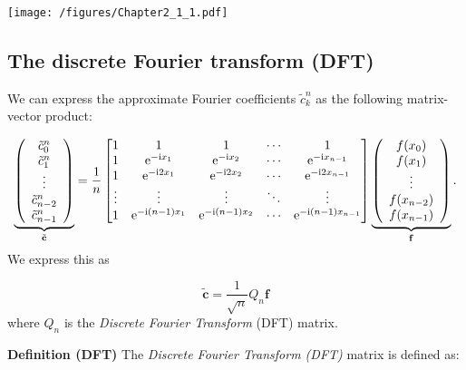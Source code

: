 \documentclass[12pt,a4paper]{article}
\begin{document}
\texttt{[image: /figures/Chapter2\_1\_1.pdf]}

\subsection{The discrete Fourier transform (DFT)}
We can express the approximate Fourier coefficients $\tilde{c}^n_k$ as the following matrix-vector product:

\[
\underbrace{\left(
\begin{array}{c}
\tilde{c}^n_0 \\
\tilde{c}^n_1 \\
\vdots \\
\tilde{c}^n_{n-2} \\
\tilde{c}^n_{n-1}
\end{array}
\right)}_{\tilde{\mathbf{c}}} = 
{1 \over n} \begin{bmatrix} 1 & 1 & 1&  \ensuremath{\cdots} & 1 \\
                                    1 & {\rm e}^{-{\rm i} x_1} & {\rm e}^{-{\rm i} x_2} & \ensuremath{\cdots} & {\rm e}^{-{\rm i} x_{n-1}} \\
                                    1 & {\rm e}^{-{\rm i} 2 x_1} & {\rm e}^{-{\rm i} 2 x_2} & \ensuremath{\cdots} & {\rm e}^{-{\rm i} 2x_{n-1}} \\
                                    \ensuremath{\vdots} & \ensuremath{\vdots} & \ensuremath{\vdots} & \ensuremath{\ddots} & \ensuremath{\vdots} \\
                                    1 & {\rm e}^{-{\rm i} (n-1) x_1} & {\rm e}^{-{\rm i} (n-1) x_2} & \ensuremath{\cdots} & {\rm e}^{-{\rm i} (n-1) x_{n-1}}
\end{bmatrix} 
\underbrace{\left(
\begin{array}{c}
f(x_0) \\
f(x_1) \\
\vdots \\
f(x_{n-2}) \\
f(x_{n-1})
\end{array}
\right)}_{\mathbf{f}}.
\]
We express this as

\[
\tilde{\mathbf{c}} = \frac{1}{\sqrt{n}}Q_{n}\mathbf{f}
\]
where $Q_n$ is the \emph{Discrete Fourier Transform} (DFT) matrix.

\textbf{Definition (DFT)} The \emph{Discrete Fourier Transform (DFT)} matrix is defined as:
\end{document}
